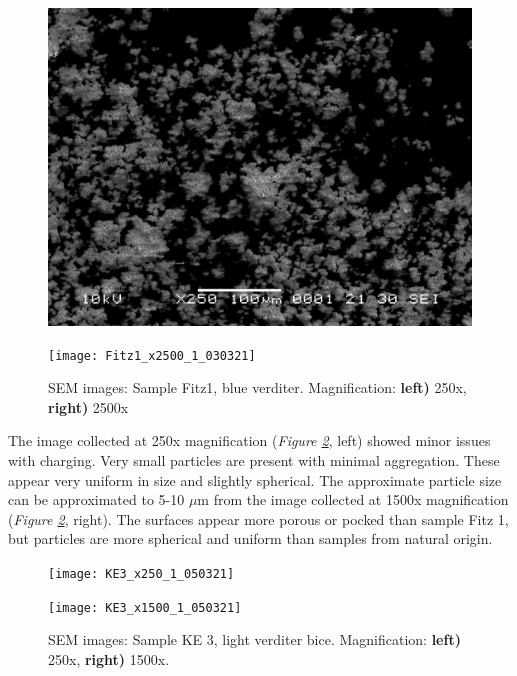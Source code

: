 \begin{figure}[H]
\centering
\begin{minipage}{.45\textwidth}
  \centering
  \includegraphics[width=\linewidth]{Fitz1_x250_1_030321}
\end{minipage}
\begin{minipage}{.45\textwidth}
  \centering
  \texttt{[image: Fitz1\_x2500\_1\_030321]}
\end{minipage}
\caption[SEM images: Sample Fitz1, blue verditer]{SEM images: Sample Fitz1, blue verditer. Magnification: \textbf{left)} 250x, \textbf{right)} 2500x}
\label{fig:Fitz1_sem_2}
\end{figure}



The image collected at 250x magnification (\textit{Figure \ref{fig:KE3_sem_2}}, left) showed minor issues with charging. Very small particles are present with minimal aggregation. These appear very uniform in size and slightly spherical. The approximate particle size can be approximated to 5-10 $\mu$m from the image collected at 1500x magnification (\textit{Figure \ref{fig:KE3_sem_2}}, right). The surfaces appear more porous or pocked than sample Fitz 1, but particles are more spherical and uniform than samples from natural origin. 


\begin{figure}[H]
\centering
\begin{minipage}{.45\textwidth}
  \centering
  \texttt{[image: KE3\_x250\_1\_050321]}
\end{minipage}
\begin{minipage}{.45\textwidth}
  \centering
  \texttt{[image: KE3\_x1500\_1\_050321]}
\end{minipage}
\caption[SEM images: Sample KE 3, light verditer bice]{SEM images: Sample KE 3, light verditer bice. Magnification: \textbf{left)} 250x, \textbf{right)} 1500x.}
\label{fig:KE3_sem_2}
\end{figure}


